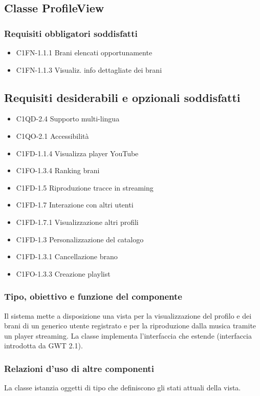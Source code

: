 \subsection{Classe ProfileView}
\subsubsection*{Requisiti obbligatori soddisfatti}
\begin{itemize}
	\item C1FN-1.1.1 Brani elencati opportunamente
	\item C1FN-1.1.3 Visualiz. info dettagliate dei brani
\end{itemize}
\subsection*{Requisiti desiderabili e opzionali soddisfatti}
\begin{itemize}
    \item C1QD-2.4 Supporto multi-lingua
    \item C1QO-2.1 Accessibilit\`a
    \item C1FD-1.1.4 Visualizza player YouTube
    \item C1FO-1.3.4 Ranking brani
    \item C1FD-1.5 Riproduzione tracce in streaming
    \item C1FD-1.7 Interazione con altri utenti
    \item C1FD-1.7.1 Visualizzazione altri profili
    \item C1FD-1.3 Personalizzazione del catalogo
    \item C1FD-1.3.1 Cancellazione brano
    \item C1FO-1.3.3 Creazione playlist
\end{itemize}
\subsubsection*{Tipo, obiettivo e funzione del componente}
Il sistema mette a disposizione una vista per la visualizzazione del profilo e
dei brani di un generico utente registrato e per la riproduzione dalla musica
tramite un player streaming. La classe  implementa
l'interfaccia  che estende  (interfaccia introdotta
da GWT 2.1).
\subsubsection*{Relazioni d'uso di altre componenti} 
La classe istanzia oggetti di tipo  che definiscono gli stati
attuali della vista.
